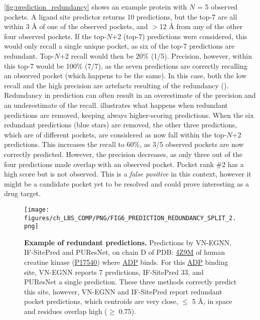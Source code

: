 \autoref{fig:prediction_redundancy} shows an example protein with $N$ = 5 observed pockets. A ligand site predictor returns 10 predictions, but the top-7 are all within 3 \AA{} of one of the observed pockets, and $>$12 \AA{} from any of the other four observed pockets. If the top-$N$+2 (top-7) predictions were considered, this would only recall a single unique pocket, as six of the top-7 predictions are redundant. Top-$N$+2 recall would then be 20\% (1/5). Precision, however, within this top-7 would be 100\% (7/7), as the seven predictions are correctly recalling an observed pocket (which happens to be the same). In this case, both the low recall and the high precision are artefacts resulting of the redundancy (). Redundancy in prediction can often result in an overestimate of the precision and an underestimate of the recall.  illustrates what happens when redundant predictions are removed, keeping always higher-scoring predictions. When the six redundant predictions (blue stars) are removed, the other three predictions, which are of different pockets, are considered as now fall within the top-$N$+2 predictions. This increases the recall to 60\%, as 3/5 observed pockets are now correctly predicted. However, the precision decreases, as only three out of the four predictions made overlap with an observed pocket. Pocket rank \#2 has a high score but is not observed. This is a \textit{false positive} in this context, however it might be a candidate pocket yet to be resolved and could prove interesting as a drug target.

\begin{figure}[htb!]
    \centering
    \texttt{[image: figures/ch\_LBS\_COMP/PNG/FIG6\_PREDICTION\_REDUNDANCY\_SPLIT\_2.png]}
    \caption[Example of redundant predictions]{\textbf{Example of redundant predictions.} Predictions by VN-EGNN, IF-SitePred and PUResNet, on chain D of PDB: \href{https://www.ebi.ac.uk/pdbe/entry/pdb/4z9m}{4Z9M} \cite{PDB_4Z9M} of human creatine kinase (\href{https://www.uniprot.org/uniprotkb/P17540/entry}{P17540}) where \href{https://www.ebi.ac.uk/pdbe-srv/pdbechem/chemicalCompound/show/ADP}{ADP} binds. For this \href{https://www.ebi.ac.uk/pdbe-srv/pdbechem/chemicalCompound/show/ADP}{ADP} binding site, VN-EGNN reports 7 predictions, IF-SitePred 33, and PUResNet a single prediction. These three methods correctly predict this site, however, VN-EGNN and IF-SitePred report redundant pocket predictions, which centroids are very close, $\leq$ 5 \AA{}, in space and residues overlap high ($\geq$ 0.75).}
    \label{fig:prediction_redundancy_examples}
\end{figure}

